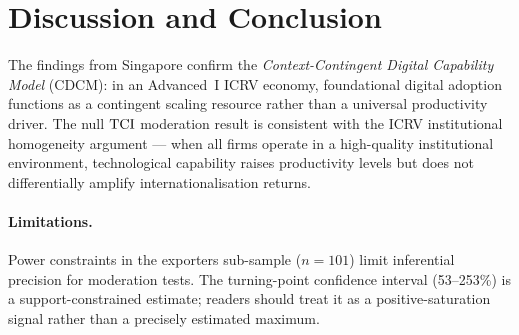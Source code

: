 \documentclass[smallextended]{svjour3}   %
\begin{document}
\section{Discussion and Conclusion}
\label{sec:discussion}

The findings from Singapore confirm the \emph{Context-Contingent Digital
Capability Model} (CDCM): in an Advanced~I ICRV economy, foundational digital
adoption functions as a contingent scaling resource rather than a universal
productivity driver.  The null \({\mathrm{TCI}}\) moderation result is consistent with
the ICRV institutional homogeneity argument --- when all firms operate in a
high-quality institutional environment, technological capability raises
productivity levels but does not differentially amplify internationalisation
returns.

\paragraph{Limitations.}
Power constraints in the exporters sub-sample (\(n = 101\)) limit inferential
precision for moderation tests.  The turning-point confidence interval
(53--253\%) is a support-constrained estimate; readers should treat it as a
positive-saturation signal rather than a precisely estimated maximum.

\printbibliography
\end{document}
